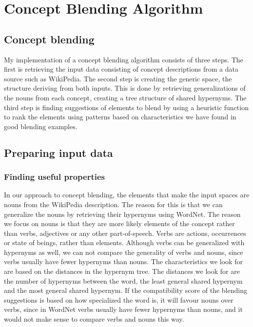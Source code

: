 
\chapter{Concept Blending Algorithm} %

\label{Chapter5} %


\section{Concept blending}
My implementation of a concept blending algorithm consists of three steps. The first is retrieving the input data consisting of concept descriptions from a data source such as WikiPedia. The second step is creating the generic space, the structure deriving from both inputs. This is done by retrieving generalizations of the nouns from each concept, creating a tree structure of shared hypernyms. The third step is finding suggestions of elements to blend by using a heuristic function to rank the elements using patterns based on characteristics we have found in good blending examples.


\section{Preparing input data}

\subsection{Finding useful properties}
In our approach to concept blending, the elements that make the input spaces are nouns from the WikiPedia description. The reason for this is that we can generalize the nouns by retrieving their hypernyms using WordNet. The reason we focus on nouns is that they are more likely elements of the concept rather than verbs, adjectives or any other part-of-speech. Verbs are actions, occurrences or state of beings, rather than elements. Although verbs can be generalized with hypernyms as well, we can not compare the generality of verbs and nouns, since verbs usually have fewer hypernyms than nouns. The characteristics we look for are based on the distances in the hypernym tree. The distances we look for are the number of hypernyms between the word, the least general shared hypernym and the most general shared hypernym. If the compatibility score of the blending suggestions is based on how specialized the word is, it will favour nouns over verbs, since in WordNet verbs usually have fewer hypernyms than nouns, and it would not make sense to compare verbs and nouns this way.


